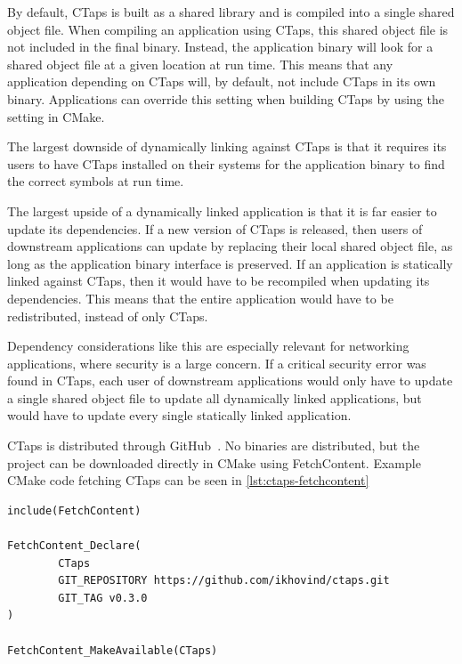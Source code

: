 By default, CTaps is built as a shared library and is compiled
into a single shared object file. When compiling an application using CTaps,
this shared object file is not included in the final binary.
Instead, the
application binary will look for a shared object file at a given location at
run time. This means that any application depending on CTaps will, by default,
not include CTaps in its own binary.
Applications can override this setting when building CTaps by
using the  setting in CMake.

The largest downside of dynamically linking against CTaps
is that it requires its users to have CTaps installed on their
systems for the application binary to find the correct symbols at run time.

The largest upside of a dynamically
linked application is that it is far easier to update its dependencies.
If a new version of CTaps is released, then users of downstream applications
can update by replacing their local shared object file, as long as the
application binary interface is preserved.
If an application is statically linked against CTaps, then it would have to be recompiled
when updating its dependencies. This means that the entire application would have
to be redistributed, instead of only CTaps.

Dependency considerations like this are especially relevant for networking applications, where security
is a large concern. If a critical security error was found in CTaps,
each user of downstream applications would only have to update a single shared object
file to update all dynamically linked applications, but would have to update every single statically
linked application.

CTaps is distributed through GitHub~\cite{cTaps}. No binaries
are distributed, but the project can be downloaded directly
in CMake using FetchContent. Example CMake code fetching CTaps can be seen
in \cref{lst:ctaps-fetchcontent}

\begin{listing}[htbp]
    \begin{verbatim}
include(FetchContent)

FetchContent_Declare(
        CTaps
        GIT_REPOSITORY https://github.com/ikhovind/ctaps.git
        GIT_TAG v0.3.0
)

FetchContent_MakeAvailable(CTaps)
    \end{verbatim}
    \caption[Fetching CTaps through FetchContent]
    {
        Example of how an application
        can fetch CTaps using FetchContent.
        A full CMakeLists.txt file for an application
        using CTaps can be seen in \cref{lst:ctaps-cmakelists}.
    }
    \label{lst:ctaps-fetchcontent}
\end{listing}

